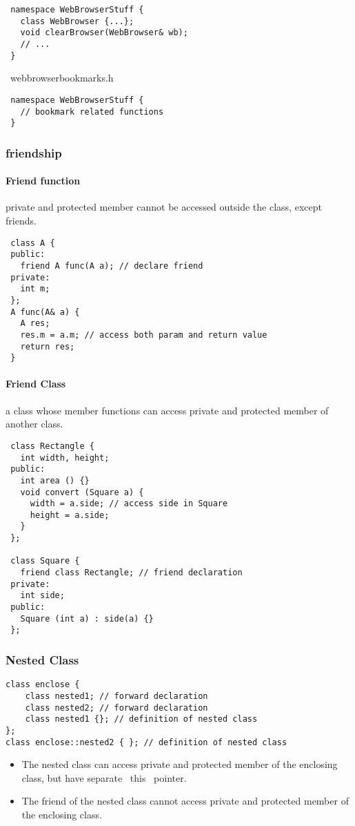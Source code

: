 \begin{lstlisting}
 namespace WebBrowserStuff {
   class WebBrowser {...};
   void clearBrowser(WebBrowser& wb);
   // ...
 }
\end{lstlisting}

 ~webbrowserbookmarks.h~

\begin{lstlisting}
 namespace WebBrowserStuff {
   // bookmark related functions
 }
\end{lstlisting}

\subsubsection{friendship}
\paragraph{Friend function}
private and protected member cannot be accessed outside the class, except friends.

\begin{lstlisting}
 class A {
 public:
   friend A func(A a); // declare friend
 private:
   int m;
 };
 A func(A& a) {
   A res;
   res.m = a.m; // access both param and return value
   return res;
 }
\end{lstlisting}

\paragraph{Friend Class}
a class whose member functions can access private and protected member
of another class.

\begin{lstlisting}
 class Rectangle {
   int width, height;
 public:
   int area () {}
   void convert (Square a) {
     width = a.side; // access side in Square
     height = a.side;
   }
 };

 class Square {
   friend class Rectangle; // friend declaration
 private:
   int side;
 public:
   Square (int a) : side(a) {}
 };
\end{lstlisting}
\subsubsection{Nested Class}
\begin{lstlisting}
class enclose {
    class nested1; // forward declaration
    class nested2; // forward declaration
    class nested1 {}; // definition of nested class
};
class enclose::nested2 { }; // definition of nested class
\end{lstlisting}
\begin{itemize}
\item The nested class can access private and protected member of the
  enclosing class, but have separate ~this~ pointer.
\item The friend of the nested class cannot access private and
  protected member of the enclosing class.
\end{itemize}




